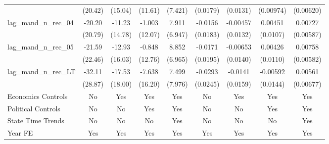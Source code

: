 {\begin{longtable}{l*{8}{c}}
                    &     (20.42)         &     (15.04)         &     (11.61)         &     (7.421)         &    (0.0179)         &    (0.0131)         &   (0.00974)         &   (0.00620)         \\
[1em]
lag\_mand\_n\_rec\_04   &      -20.20         &      -11.23         &      -1.003         &       7.911         &     -0.0156         &    -0.00457         &     0.00451         &     0.00727         \\
                    &     (20.79)         &     (14.78)         &     (12.07)         &     (6.947)         &    (0.0183)         &    (0.0132)         &    (0.0107)         &   (0.00587)         \\
[1em]
lag\_mand\_n\_rec\_05   &      -21.59         &      -12.93         &      -0.848         &       8.852         &     -0.0171         &    -0.00653         &     0.00426         &     0.00758         \\
                    &     (22.46)         &     (16.03)         &     (12.76)         &     (6.965)         &    (0.0195)         &    (0.0140)         &    (0.0110)         &   (0.00582)         \\
[1em]
lag\_mand\_n\_rec\_LT   &      -32.11         &      -17.53         &      -7.638         &       7.499         &     -0.0293         &     -0.0141         &    -0.00592         &     0.00561         \\
                    &     (28.87)         &     (18.00)         &     (16.20)         &     (7.976)         &    (0.0245)         &    (0.0159)         &    (0.0144)         &   (0.00677)         \\
[1em]
Economics Controls  &          No         &         Yes         &         Yes         &         Yes         &          No         &         Yes         &         Yes         &         Yes         \\
[1em]
Political Controls  &          No         &          No         &         Yes         &         Yes         &          No         &          No         &         Yes         &         Yes         \\
[1em]
State Time Trends   &          No         &          No         &          No         &         Yes         &          No         &          No         &          No         &         Yes         \\
[1em]
Year FE             &         Yes         &         Yes         &         Yes         &         Yes         &         Yes         &         Yes         &         Yes         &         Yes         \\

\end{longtable}}
